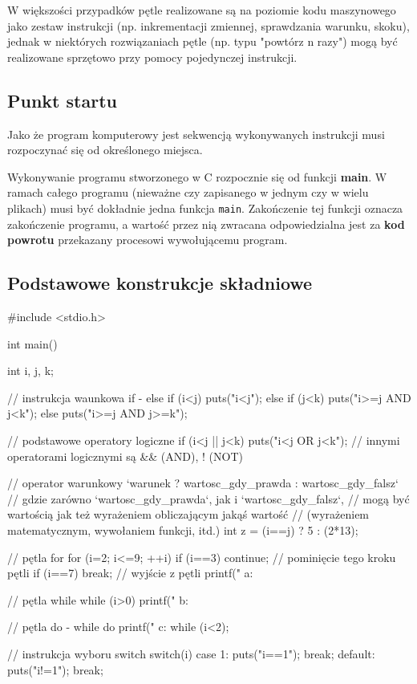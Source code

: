 W większości przypadków pętle realizowane są na poziomie kodu maszynowego jako zestaw instrukcji (np. inkrementacji zmiennej, sprawdzania warunku, skoku), jednak w niektórych rozwiązaniach pętle (np. typu "powtórz n razy") mogą być realizowane sprzętowo przy pomocy pojedynczej instrukcji.

\subsection{Punkt startu}

Jako że program komputerowy jest sekwencją wykonywanych instrukcji musi rozpoczynać się od określonego miejsca.

Wykonywanie programu stworzonego w C rozpocznie się od funkcji \textbf{main}. W ramach całego programu (nieważne czy zapisanego w jednym czy w wielu plikach) musi być dokładnie jedna funkcja \Verb$main$. Zakończenie tej funkcji oznacza zakończenie programu, a wartość przez nią zwracana odpowiedzialna jest za \textbf{kod powrotu} przekazany procesowi wywołującemu program.


\subsection{Podstawowe konstrukcje składniowe}

\begin{CodeFrame*}[c]{}
#include <stdio.h>

int main() {
    int i, j, k;
    
    // instrukcja waunkowa if - else
    if (i<j) {
        puts("i<j");
    } else if (j<k) {
        puts("i>=j AND j<k");
    } else {
        puts("i>=j AND j>=k");
    }
    
    // podstawowe operatory logiczne
    if (i<j || j<k)
        puts("i<j OR j<k");
    // innymi operatorami logicznymi są && (AND), ! (NOT)
    
    // operator warunkowy `warunek ? wartosc_gdy_prawda : wartosc_gdy_falsz`
    // gdzie zarówno `wartosc_gdy_prawda`, jak i `wartosc_gdy_falsz`,
    // mogą być wartością jak też wyrażeniem obliczającym jakąś wartość
    // (wyrażeniem matematycznym, wywołaniem funkcji, itd.)
    int z = (i==j) ? 5 : (2*13);
    
    // pętla for
    for (i=2; i<=9; ++i) {
        if (i==3)
            continue; // pominięcie tego kroku pętli
        if (i==7)
            break; // wyjście z pętli
        printf(" a: %
    }
    
    // pętla while
    while (i>0) {
        printf(" b: %
    }
    
    // pętla do - while
    do {
        printf(" c: %
    } while (i<2);
    
    // instrukcja wyboru switch
    switch(i) {
        case 1:
            puts("i==1");
            break;
        default:
            puts("i!=1");
            break;
    }
}
\end{CodeFrame*}

